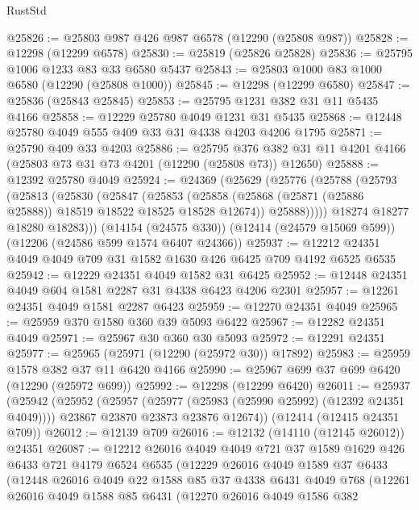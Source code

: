 \begin{lexlean}{RustStd}
\begin{coremodule}
@25826 := @25803 @987 @426 @987 @6578 (@12290 (@25808 @987))
@25828 := @12298 (@12299 @6578)
@25830 := @25819 (@25826 @25828)
@25836 := @25795 @1006 @1233 @83 @33 @6580 @5437
@25843 := @25803 @1000 @83 @1000 @6580 (@12290 (@25808 @1000))
@25845 := @12298 (@12299 @6580)
@25847 := @25836 (@25843 @25845)
@25853 := @25795 @1231 @382 @31 @11 @5435 @4166
@25858 := @12229 @25780 @4049 @1231 @31 @5435
@25868 := @12448 @25780 @4049 @555 @409 @33 @31 @4338 @4203 @4206 @1795
@25871 := @25790 @409 @33 @4203
@25886 := @25795
    @376
    @382
    @31
    @11
    @4201
    @4166
    (@25803 @73 @31 @73 @4201 (@12290 (@25808 @73)) @12650)
@25888 := @12392 @25780 @4049
@25924 := @24369
    (@25629
      (@25776
        (@25788
          (@25793
            (@25813
              (@25830
                (@25847
                  (@25853
                    (@25858 (@25868 (@25871 (@25886 @25888)) @18519 @18522 @18525 @18528 @12674))
                    @25888)))))
          @18274
          @18277
          @18280
          @18283)))
    (@14154 (@24575 @330))
    (@12414 (@24579 @15069 @599))
    (@12206 (@24586 @599 @1574 @6407 @24366))
@25937 := @12212 @24351 @4049 @4049 @709 @31 @1582 @1630 @426 @6425 @709 @4192 @6525 @6535
@25942 := @12229 @24351 @4049 @1582 @31 @6425
@25952 := @12448 @24351 @4049 @604 @1581 @2287 @31 @4338 @6423 @4206 @2301
@25957 := @12261 @24351 @4049 @1581 @2287 @6423
@25959 := @12270 @24351 @4049
@25965 := @25959 @370 @1580 @360 @39 @5093 @6422
@25967 := @12282 @24351 @4049
@25971 := @25967 @30 @360 @30 @5093
@25972 := @12291 @24351
@25977 := @25965 (@25971 (@12290 (@25972 @30)) @17892)
@25983 := @25959 @1578 @382 @37 @11 @6420 @4166
@25990 := @25967 @699 @37 @699 @6420 (@12290 (@25972 @699))
@25992 := @12298 (@12299 @6420)
@26011 := @25937
    (@25942
      (@25952
        (@25957 (@25977 (@25983 (@25990 @25992) (@12392 @24351 @4049))))
        @23867
        @23870
        @23873
        @23876
        @12674))
    (@12414 (@12415 @24351 @709))
@26012 := @12139 @709
@26016 := @12132 (@14110 (@12145 @26012)) @24351
@26087 := @12212
    @26016
    @4049
    @4049
    @721
    @37
    @1589
    @1629
    @426
    @6433
    @721
    @4179
    @6524
    @6535
    (@12229
      @26016
      @4049
      @1589
      @37
      @6433
      (@12448
        @26016
        @4049
        @22
        @1588
        @85
        @37
        @4338
        @6431
        @4049
        @768
        (@12261
          @26016
          @4049
          @1588
          @85
          @6431
          (@12270
            @26016
            @4049
            @1586
            @382

\end{coremodule}
\end{lexlean}

